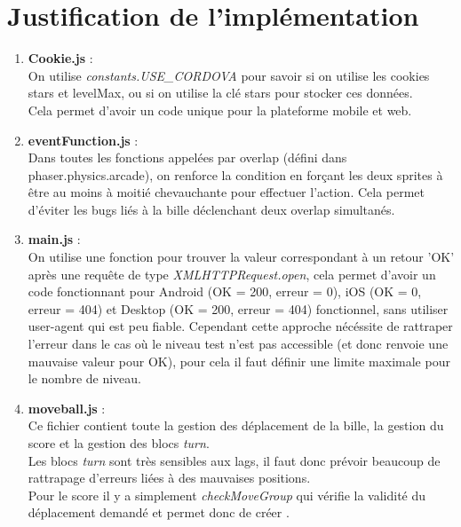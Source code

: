 \documentclass[11pt]{article}
\begin{document}
\section {Justification de l'implémentation}
\begin{enumerate}
	\item
		\textbf{Cookie.js} :\\
		On utilise {\em constants.USE\_CORDOVA} pour savoir si on 
		utilise les cookies stars et levelMax, ou si on utilise
		la clé stars pour stocker ces données.\\
		Cela permet d'avoir un code unique pour la plateforme mobile et
		web.\\
	\item
		\textbf{eventFunction.js} :\\
		Dans toutes les fonctions appelées par overlap (défini dans 
		phaser.physics.arcade), on renforce la condition en forçant les
		deux sprites à être au moins à moitié chevauchante pour
		effectuer l'action. Cela permet d'éviter les bugs liés à la
		bille déclenchant deux overlap simultanés.\\
	\item
		\textbf{main.js} : \\
		On utilise une fonction pour trouver la valeur correspondant à
		un retour 'OK' après une requête de type 
		{\em XMLHTTPRequest.open}, cela permet d'avoir un code
		fonctionnant pour Android (OK = 200, erreur = 0), iOS (OK = 0,
		erreur = 404) et Desktop (OK = 200, erreur = 404) fonctionnel, 
		sans utiliser user-agent qui est peu fiable. Cependant cette
		approche nécéssite de rattraper l'erreur dans le cas où le 
		niveau test n'est pas accessible (et donc renvoie une mauvaise 
		valeur pour OK), pour cela il faut définir une limite maximale
		pour le nombre de niveau.\\
	\item
		\textbf{moveball.js} : \\
		Ce fichier contient toute la gestion des déplacement de la
		bille, la gestion du score et la gestion des blocs {\em turn}.\\
		Les blocs {\em turn} sont très sensibles aux lags, il faut
		donc prévoir beaucoup de rattrapage d'erreurs liées à des 
		mauvaises positions.\\
		Pour le score il y a simplement {\em checkMoveGroup} qui
		vérifie la validité du déplacement demandé et permet donc de 
		créer .\\
\end{enumerate}
\end{document}
